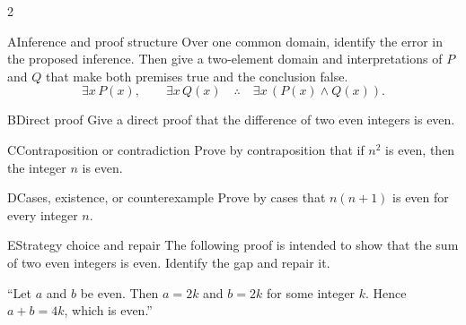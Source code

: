 \documentclass[9pt]{extarticle}
\begin{document}
\begin{multicols}{2}
\begin{CoreProblem}{A}{Inference and proof structure}
Over one common domain, identify the error in the proposed inference. Then give
a two-element domain and interpretations of $P$ and $Q$ that make both premises
true and the conclusion false.
\[
\exists x\,P(x),\qquad \exists x\,Q(x)
\quad\therefore\quad
\exists x\,(P(x)\land Q(x)).
\]
\end{CoreProblem}
\begin{CoreProblem}{B}{Direct proof}
Give a direct proof that the difference of two even integers is even.
\end{CoreProblem}
\begin{CoreProblem}{C}{Contraposition or contradiction}
Prove by contraposition that if $n^2$ is even, then the integer $n$ is even.
\end{CoreProblem}
\columnbreak
\begin{CoreProblem}{D}{Cases, existence, or counterexample}
Prove by cases that $n(n+1)$ is even for every integer $n$.
\end{CoreProblem}
\begin{CoreProblem}{E}{Strategy choice and repair}
The following proof is intended to show that the sum of two even integers is even. Identify the gap and repair it.

``Let $a$ and $b$ be even. Then $a=2k$ and $b=2k$ for some integer $k$. Hence $a+b=4k$, which is even.''
\end{CoreProblem}
\end{multicols}
\CoreWorkArea
\FormBreak
{}
\end{document}
